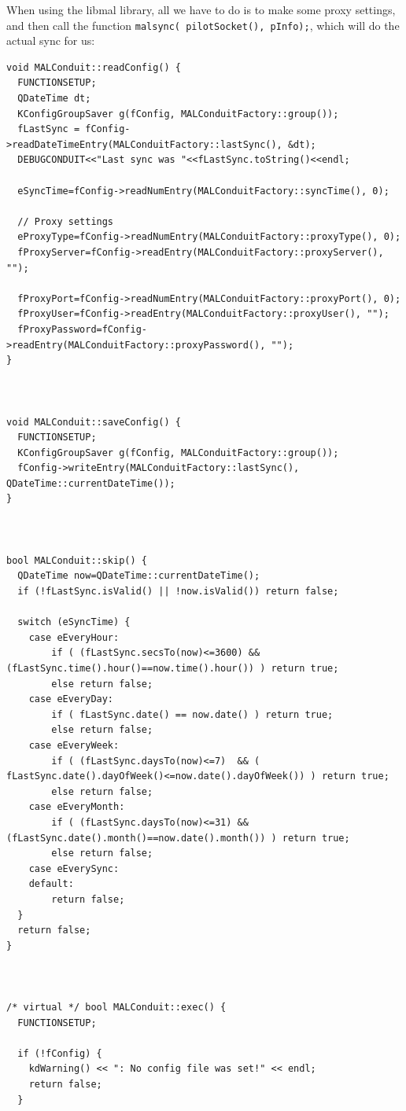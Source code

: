\documentclass[10pt,a4paper]{article}
\begin{document}
When using the libmal library, all we have to do is to make some proxy settings, and then call the function \texttt{malsync( pilotSocket(), pInfo);}, which will do the actual sync for us:
{\footnotesize
\begin{verbatim}
void MALConduit::readConfig() {
  FUNCTIONSETUP;
  QDateTime dt;
  KConfigGroupSaver g(fConfig, MALConduitFactory::group());
  fLastSync = fConfig->readDateTimeEntry(MALConduitFactory::lastSync(), &dt);
  DEBUGCONDUIT<<"Last sync was "<<fLastSync.toString()<<endl;

  eSyncTime=fConfig->readNumEntry(MALConduitFactory::syncTime(), 0);
  
  // Proxy settings
  eProxyType=fConfig->readNumEntry(MALConduitFactory::proxyType(), 0);
  fProxyServer=fConfig->readEntry(MALConduitFactory::proxyServer(), "");

  fProxyPort=fConfig->readNumEntry(MALConduitFactory::proxyPort(), 0);
  fProxyUser=fConfig->readEntry(MALConduitFactory::proxyUser(), "");
  fProxyPassword=fConfig->readEntry(MALConduitFactory::proxyPassword(), "");
}



void MALConduit::saveConfig() {
  FUNCTIONSETUP;
  KConfigGroupSaver g(fConfig, MALConduitFactory::group());
  fConfig->writeEntry(MALConduitFactory::lastSync(), QDateTime::currentDateTime());
}



bool MALConduit::skip() {
  QDateTime now=QDateTime::currentDateTime();
  if (!fLastSync.isValid() || !now.isValid()) return false;

  switch (eSyncTime) {
    case eEveryHour:
        if ( (fLastSync.secsTo(now)<=3600) && (fLastSync.time().hour()==now.time().hour()) ) return true;
        else return false;
    case eEveryDay:
        if ( fLastSync.date() == now.date() ) return true;
        else return false;
    case eEveryWeek:
        if ( (fLastSync.daysTo(now)<=7)  && ( fLastSync.date().dayOfWeek()<=now.date().dayOfWeek()) ) return true;
        else return false;
    case eEveryMonth:
        if ( (fLastSync.daysTo(now)<=31) && (fLastSync.date().month()==now.date().month()) ) return true;
        else return false;
    case eEverySync:
    default:
        return false;
  }
  return false;
}



/* virtual */ bool MALConduit::exec() {
  FUNCTIONSETUP;

  if (!fConfig) {
    kdWarning() << ": No config file was set!" << endl;
    return false;
  }


\end{verbatim}}
\end{document}
